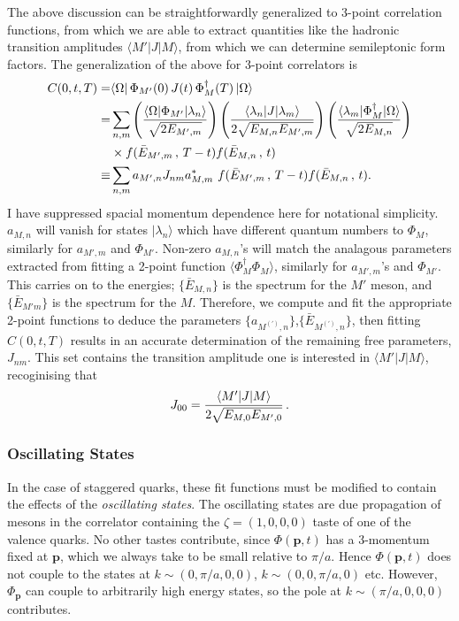 The above discussion can be straightforwardly generalized to 3-point correlation functions, from which we are able to extract quantities like the hadronic transition amplitudes $\langle M' | J | M \rangle$, from which we can determine semileptonic form factors. The generalization of the above for 3-point correlators is
\begin{align}
  \nonumber
  C(0,t,T) =& \langle \Omega | \, \Phi_{M'}(0)\, J(t)\, \Phi_{M}^{\dagger}(T)\, | \Omega \rangle
  \\ \nonumber
  =& \sum_{n,m}  \left( {\langle \Omega | \Phi_{M'} | \lambda_n \rangle \over \sqrt{2E_{M',m}}} \right) \left({\langle \lambda_n | J | \lambda_m \rangle \over 2\sqrt{ E_{M,n} E_{M',m} } }\right) \left( {\langle \lambda_m | \Phi_{M}^{\dagger} | \Omega \rangle \over \sqrt{2E_{M,n}} } \right) \\ \nonumber &\times f(\bar{E}_{M',m}\,,\,T-t) f(\bar{E}_{M,n}\,,\,t) \\
  \equiv& \sum_{n,m} a_{M',n} J_{nm} a^*_{M,m} \,\, f(\bar{E}_{M',m}\,,\,T-t) f(\bar{E}_{M,n}\,,\,t).
  \label{eq:3ptfitfunction}
\end{align}
I have suppressed spacial momentum dependence here for notational simplicity. $a_{M,n}$ will vanish for states $|\lambda_n\rangle$ which have different quantum numbers to $\Phi_{M}$, similarly for $a_{M',m}$ and $\Phi_{M'}$. Non-zero $a_{M,n}$'s will match the analagous parameters extracted from fitting a 2-point function $\langle \Phi_{M}^{\dagger} \Phi_{M} \rangle$, similarly for $a_{M',m}$'s and $\Phi_{M'}$. This carries on to the energies; $\{\bar{E}_{M,n}\}$ is the spectrum for the $M'$ meson, and $\{\bar{E}_{M'm}\}$ is the spectrum for the $M$. Therefore, we compute and fit the appropriate 2-point functions to deduce the parameters $\{a_{M^{(')},n}\}$,$\{\bar{E}_{M^{(')},n}\}$, then fitting $C(0,t,T)$ results in an accurate determination of the remaining free parameters, $J_{nm}$. This set contains the transition amplitude one is interested in $\langle M' | J | M \rangle$, recoginising that
\begin{align}
  J_{00} = {\langle M' | J | M \rangle \over 2\sqrt{E_{M,0} E_{M',0} } }\,.
\end{align}

\subsubsection{Oscillating States}

In the case of staggered quarks, these fit functions must be modified to contain the effects of the {\it{oscillating states}}. The oscillating states are due propagation of mesons in the correlator containing the $\zeta=(1,0,0,0)$ taste of one of the valence quarks. No other tastes contribute, since $\Phi({{\textbf{p}}},t)$ has a 3-momentum fixed at ${\textbf{p}}$, which we always take to be small relative to $\pi/a$. Hence $\Phi({\textbf{p}},t)$ does not couple to the states at $k\sim(0,\pi/a,0,0)$, $k\sim(0,0,\pi/a,0)$ etc. However, $\Phi_{{\textbf{p}}}$ can couple to arbitrarily high energy states, so the pole at $k\sim(\pi/a,0,0,0)$ contributes.

